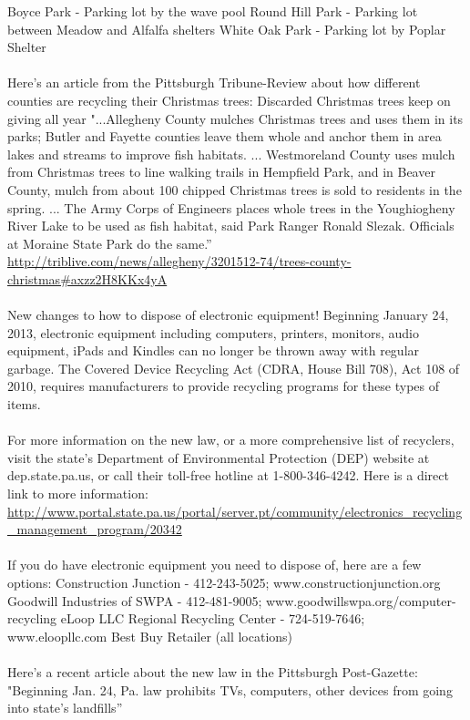 \documentclass[10pt,a4paper]{article}
\begin{document}
\begin{multicols}{2}
Boyce Park - Parking lot by the wave pool
Round Hill Park - Parking lot between Meadow and Alfalfa shelters
White Oak Park - Parking lot by Poplar Shelter
\\
\\
Here's an article from the Pittsburgh Tribune-Review about how different counties are recycling their Christmas trees:
Discarded Christmas trees keep on giving all year
"...Allegheny County mulches Christmas trees and uses them in its parks; Butler and Fayette counties leave them whole and anchor them in area lakes and streams to improve fish habitats. ... Westmoreland County uses mulch from Christmas trees to line walking trails in Hempfield Park, and in Beaver County, mulch from about 100 chipped Christmas trees is sold to residents in the spring.  ... The Army Corps of Engineers places whole trees in the Youghiogheny River Lake to be used as fish habitat, said Park Ranger Ronald Slezak. Officials at Moraine State Park do the same.”
\url{http://triblive.com/news/allegheny/3201512-74/trees-county-christmas#axzz2H8KKx4yA}
\\
\\
New changes to how to dispose of electronic equipment!
Beginning January 24, 2013, electronic equipment including computers, printers, monitors, audio equipment, iPads and Kindles can no longer be thrown away with regular garbage.  The Covered Device Recycling Act (CDRA, House Bill 708), Act 108 of 2010, requires manufacturers to provide recycling programs for these types of items.  
\\
\\
For more information on the new law, or a more comprehensive list of recyclers, visit the state's Department of Environmental Protection (DEP) website at dep.state.pa.us, or call their toll-free hotline at 1-800-346-4242.  Here is a direct link to more information:
\url{http://www.portal.state.pa.us/portal/server.pt/community/electronics_recycling_management_program/20342}
\\
\\
If you do have electronic equipment you need to dispose of, here are a few options:
Construction Junction - 412-243-5025; www.constructionjunction.org 
Goodwill Industries of SWPA - 412-481-9005; www.goodwillswpa.org/computer-recycling 
eLoop LLC Regional Recycling Center - 724-519-7646; www.eloopllc.com
Best Buy Retailer (all locations)
\\
\\
Here's a recent article about the new law in the Pittsburgh Post-Gazette: 
"Beginning Jan. 24, Pa. law prohibits TVs, computers, other devices from going into state's landfills”

\end{multicols}
\end{document}
